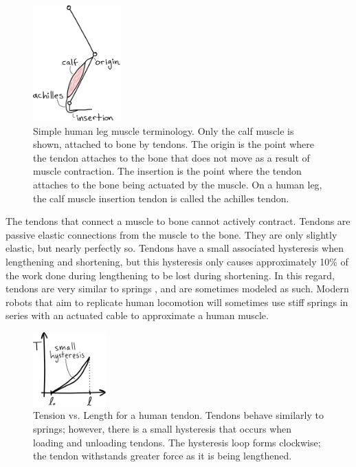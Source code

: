 \begin{figure}[htb]		%
\begin{centering}
\includegraphics[width=0.3\textwidth]{Figures/HumanLeg}\par
\end{centering}
\caption[Diagram: Simple Human Leg Muscle Terminology]{Simple human leg muscle terminology. Only the calf muscle is shown, attached to bone by tendons. The origin is the point where the tendon attaches to the bone that does not move as a result of muscle contraction. The insertion is the point where the tendon attaches to the bone being actuated by the muscle. On a human leg, the calf muscle insertion tendon is called the achilles tendon.}
\label{fig:HumanLeg}
\end{figure}
%

The tendons that connect a muscle to bone cannot actively contract. Tendons  are passive elastic connections from the muscle to the bone. They are only slightly elastic, but nearly perfectly so. Tendons have a small associated hysteresis  when lengthening and shortening, but this hysteresis only causes approximately 10\% of the work done during lengthening to be lost during shortening. In this regard, tendons are very similar to springs , and are sometimes modeled as such. Modern robots that aim to replicate human locomotion will sometimes use stiff springs in series with an actuated cable to approximate a human muscle. 

\begin{figure}[htb]		%
\begin{centering}
\includegraphics[width=0.25\textwidth]{Figures/TendonTensionPlot}\par
\end{centering}
\caption[Plot: Tension vs. Length for a Human Tendon]{Tension vs. Length for a human tendon. Tendons behave similarly to springs; however, there is a small hysteresis that occurs when loading and unloading tendons. The hysteresis loop forms clockwise; the tendon withstands greater force as it is being lengthened.}
\label{fig:TendonTensionPlot}
\end{figure}
%

